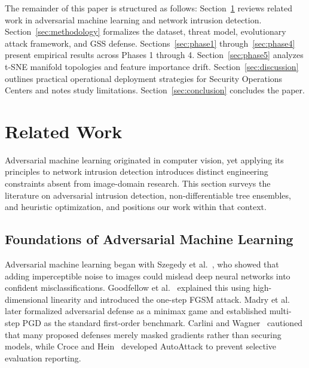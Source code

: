 \documentclass[final,5p,times,twocolumn]{elsarticle}
\begin{document}
The remainder of this paper is structured as follows: Section~\ref{sec:related} reviews related work in adversarial machine learning and network intrusion detection. Section~\ref{sec:methodology} formalizes the dataset, threat model, evolutionary attack framework, and GSS defense. Sections~\ref{sec:phase1} through~\ref{sec:phase4} present empirical results across Phases 1 through 4. Section~\ref{sec:phase5} analyzes t-SNE manifold topologies and feature importance drift. Section~\ref{sec:discussion} outlines practical operational deployment strategies for Security Operations Centers and notes study limitations. Section~\ref{sec:conclusion} concludes the paper.
\section{Related Work}
\label{sec:related}

Adversarial machine learning originated in computer vision, yet applying its principles to network intrusion detection introduces distinct engineering constraints absent from image-domain research. This section surveys the literature on adversarial intrusion detection, non-differentiable tree ensembles, and heuristic optimization, and positions our work within that context.

\subsection{Foundations of Adversarial Machine Learning}
Adversarial machine learning began with Szegedy et al.~\cite{szegedy2014intriguing}, who showed that adding imperceptible noise to images could mislead deep neural networks into confident misclassifications. Goodfellow et al.~\cite{goodfellow2014explaining} explained this using high-dimensional linearity and introduced the one-step FGSM attack. Madry et al.~\cite{madry2018towards} later formalized adversarial defense as a minimax game and established multi-step PGD as the standard first-order benchmark. Carlini and Wagner~\cite{carlini2017evaluating} cautioned that many proposed defenses merely masked gradients rather than securing models, while Croce and Hein~\cite{croce2020reliable} developed AutoAttack to prevent selective evaluation reporting.
\end{document}
